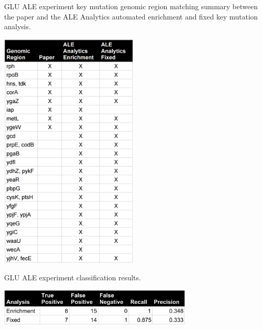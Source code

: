 \documentclass[12pt,final,masters,chapterheads]{ucsd}  %
\begin{document}
\begin{table}[H]
  \caption{GLU ALE experiment {key mutation} genomic region matching summary between the paper and the ALE Analytics automated enrichment and fixed key mutation analysis.}
  \centering
  \includegraphics[width=0.5\textwidth]{glu_key_mutation_regions.png}
\end{table}
\begin{table}[H]
  \centering
   \caption{GLU ALE experiment classification results.}
  \includegraphics[width=0.7\textwidth]{glu_precision_recall.png}
\end{table}
\end{document}
